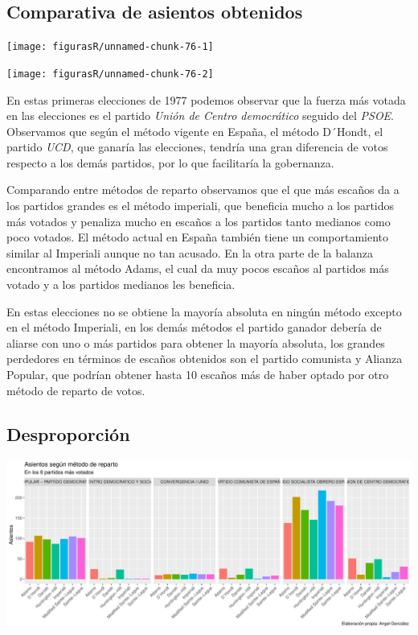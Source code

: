 \documentclass[12pt,a4paper,]{book}
\numberwithin{dummy}{section}
\theoremstyle{ocrenumbox}
\theoremstyle{blacknumex}
\theoremstyle{blacknumbox}
\theoremstyle{ocrenum}
\theoremstyle{ocrenum}
\begin{document}
\hypertarget{comparativa-de-asientos-obtenidos}{%
\subsection{Comparativa de asientos
obtenidos}\label{comparativa-de-asientos-obtenidos}}

\begin{center}\texttt{[image: figurasR/unnamed-chunk-76-1]} \end{center}

\begin{center}\texttt{[image: figurasR/unnamed-chunk-76-2]} \end{center}

En estas primeras elecciones de 1977 podemos observar que la fuerza más
votada en las elecciones es el partido \emph{Unión de Centro
democrático} seguido del \emph{PSOE}. Observamos que según el método
vigente en España, el método D´Hondt, el partido \emph{UCD}, que ganaría
las elecciones, tendría una gran diferencia de votos respecto a los
demás partidos, por lo que facilitaría la gobernanza.

Comparando entre métodos de reparto observamos que el que más escaños da
a los partidos grandes es el método imperiali, que beneficia mucho a los
partidos más votados y penaliza mucho en escaños a los partidos tanto
medianos como poco votados. El método actual en España también tiene un
comportamiento similar al Imperiali aunque no tan acusado. En la otra
parte de la balanza encontramos al método Adams, el cual da muy pocos
escaños al partidos más votado y a los partidos medianos les beneficia.

En estas elecciones no se obtiene la mayoría absoluta en ningún método
excepto en el método Imperiali, en los demás métodos el partido ganador
debería de aliarse con uno o más partidos para obtener la mayoría
absoluta, los grandes perdedores en términos de escaños obtenidos son el
partido comunista y Alianza Popular, que podrían obtener hasta 10
escaños más de haber optado por otro método de reparto de votos.

\hypertarget{desproporciuxf3n}{%
\subsection{Desproporción}\label{desproporciuxf3n}}

\begin{center}\includegraphics[width=1\linewidth]{figurasR/unnamed-chunk-77-1} \end{center}
\end{document}
